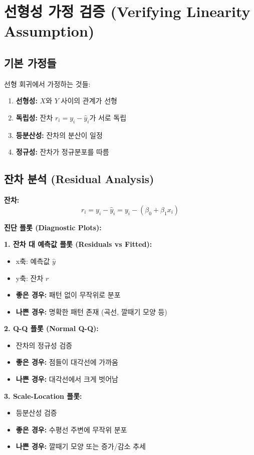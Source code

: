 \documentclass[12pt]{article}
\begin{document}
\section{선형성 가정 검증 (Verifying Linearity Assumption)}

\subsection{기본 가정들}

선형 회귀에서 가정하는 것들:
\begin{enumerate}
    \item \textbf{선형성:} $X$와 $Y$ 사이의 관계가 선형
    \item \textbf{독립성:} 잔차 $r_i = y_i - \hat{y}_i$가 서로 독립
    \item \textbf{등분산성:} 잔차의 분산이 일정
    \item \textbf{정규성:} 잔차가 정규분포를 따름
\end{enumerate}

\subsection{잔차 분석 (Residual Analysis)}

\textbf{잔차:}
\begin{equation}
r_i = y_i - \hat{y}_i = y_i - (\beta_0 + \beta_1 x_i)
\end{equation}

\textbf{진단 플롯 (Diagnostic Plots):}

\textbf{1. 잔차 대 예측값 플롯 (Residuals vs Fitted):}
\begin{itemize}
    \item x축: 예측값 $\hat{y}$
    \item y축: 잔차 $r$
    \item \textbf{좋은 경우:} 패턴 없이 무작위로 분포
    \item \textbf{나쁜 경우:} 명확한 패턴 존재 (곡선, 깔때기 모양 등)
\end{itemize}

\textbf{2. Q-Q 플롯 (Normal Q-Q):}
\begin{itemize}
    \item 잔차의 정규성 검증
    \item \textbf{좋은 경우:} 점들이 대각선에 가까움
    \item \textbf{나쁜 경우:} 대각선에서 크게 벗어남
\end{itemize}

\textbf{3. Scale-Location 플롯:}
\begin{itemize}
    \item 등분산성 검증
    \item \textbf{좋은 경우:} 수평선 주변에 무작위 분포
    \item \textbf{나쁜 경우:} 깔때기 모양 또는 증가/감소 추세
\end{itemize}
\end{document}
